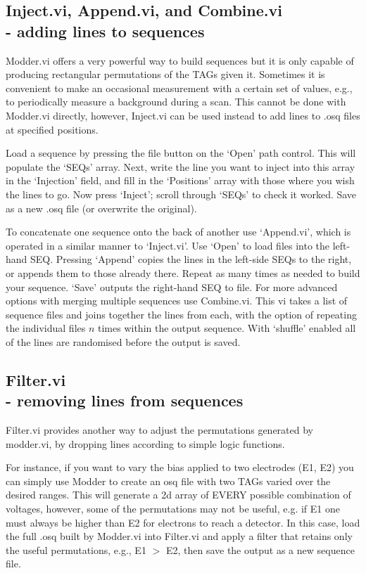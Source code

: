 \documentclass[10pt,a4paper]{article}
\begin{document}
\subsection[Inject.vi, Append.vi, and Combine.vi]{Inject.vi, Append.vi, and Combine.vi\\ %
	\normalsize - adding lines to sequences}
Modder.vi offers a very powerful way to build sequences but it is only capable of producing rectangular permutations of the TAGs given it.  Sometimes it is convenient to make an occasional measurement with a certain set of values, e.g., to periodically measure a background during a scan.  This cannot be done with Modder.vi directly, however, Inject.vi can be used instead to add lines to .osq files at specified positions.

Load a sequence by pressing the file button on the `Open' path control.  This will populate the `SEQs' array.  Next, write the line you want to inject into this array in the `Injection' field, and fill in the `Positions' array with those where you wish the lines to go.  Now press `Inject'; scroll through `SEQs'  to check it worked.  Save as a new .osq file (or overwrite the original).

To concatenate one sequence onto the back of another use `Append.vi', which is operated in a  similar manner to `Inject.vi'.  Use `Open' to load files into the left-hand SEQ. Pressing `Append' copies the lines in the left-side SEQs to the right, or appends them to those already there.  Repeat as many times as needed to build your sequence. `Save' outputs the right-hand SEQ to file. For more advanced options with merging multiple sequences use Combine.vi. This vi takes a list of sequence files and joins together the lines from each, with the option of repeating the individual files $n$ times within the output sequence.  With `shuffle' enabled all of the lines are randomised before the output is saved.

\subsection[Filter.vi]{Filter.vi\\ %
	\normalsize - removing lines from sequences}
Filter.vi provides another way to adjust the permutations generated by modder.vi, by dropping lines according to simple logic functions.  

For instance, if you want to vary the bias applied to two electrodes (E1, E2) you can simply use Modder to create an osq file with two TAGs varied over the desired ranges.  This will generate a 2d array of EVERY possible combination of voltages, however, some of the permutations may not be useful, e.g. if E1 one must always be higher than E2 for electrons to reach a detector.  In this case, load the full .osq built by Modder.vi into Filter.vi and apply a filter that retains only the useful permutations, e.g., E1 $>$ E2, then save the output as a new sequence file.
\end{document}
